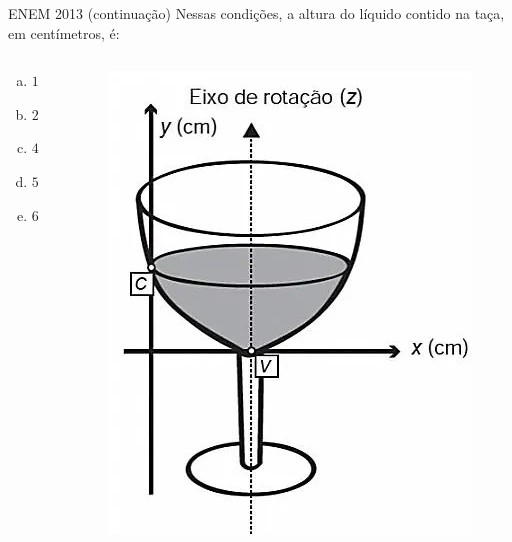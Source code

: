 \documentclass[11pt]{beamer}
\begin{document}
\begin{frame}{ENEM 2013 (continuação)}
    Nessas condições, a altura do líquido contido na taça, em centímetros, é:
    \begin{columns}
        \begin{column}{0.4\textwidth}
            \begin{enumerate}[a)]
                \item $1$ 
                \item $2$  
                \item $4$
                \item $5$ 
                \item $6$ %
            \end{enumerate}
        \end{column}

        \begin{column}{0.6\textwidth}
            \centering
            \includegraphics[width=0.7\linewidth]{imagens/enem 2013.png}
        \end{column}
    \end{columns}
    
\end{frame}
    
\end{document}
